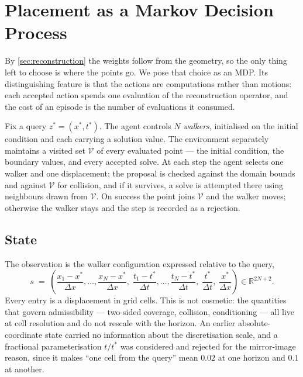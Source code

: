 
\section{Placement as a Markov Decision Process}
\label{sec:mdp}

By \cref{sec:reconstruction} the weights follow from the geometry, so the only
thing left to choose is where the points go. We pose that choice as an MDP. Its
distinguishing feature is that the actions are computations rather than
motions: each accepted action spends one evaluation of the reconstruction
operator, and the cost of an episode is the number of evaluations it consumed.

Fix a query $z^{*} = (x^{*},t^{*})$. The agent controls $N$ \emph{walkers},
initialised on the initial condition and each carrying a solution value. The
environment separately maintains a visited set $\mathcal{V}$ of every evaluated
point --- the initial condition, the boundary values, and every accepted solve.
At each step the agent selects one walker and one displacement; the proposal is
checked against the domain bounds and against $\mathcal{V}$ for collision, and
if it survives, a solve is attempted there using neighbours drawn from
$\mathcal{V}$. On success the point joins $\mathcal{V}$ and the walker moves;
otherwise the walker stays and the step is recorded as a rejection.

\subsection{State}
\label{sec:mdp_state}

The observation is the walker configuration expressed relative to the query,
%
\begin{equation}
  s \;=\;
  \left(
    \frac{x_1 - x^{*}}{\Delta x}, \dots, \frac{x_N - x^{*}}{\Delta x},\;
    \frac{t_1 - t^{*}}{\Delta t}, \dots, \frac{t_N - t^{*}}{\Delta t},\;
    \frac{t^{*}}{\Delta t},\; \frac{x^{*}}{\Delta x}
  \right) \in \mathbb{R}^{2N+2}.
  \label{eq:state}
\end{equation}
%
Every entry is a displacement in grid cells. This is not cosmetic: the
quantities that govern admissibility --- two-sided coverage, collision,
conditioning --- all live at cell resolution and do not rescale with the
horizon. An earlier absolute-coordinate state carried no information about the
discretisation scale, and a fractional parameterisation $t/t^{*}$ was
considered and rejected for the mirror-image reason, since it makes ``one cell
from the query'' mean $0.02$ at one horizon and $0.1$ at another.

